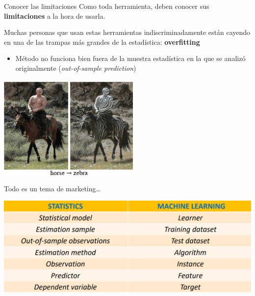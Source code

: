 \documentclass[11pt,handout,aspectratio=169]{beamer}
\begin{document}
\begin{frame}{Conocer las limitaciones}
Como toda herramienta, deben conocer sus \textbf{limitaciones} a la hora de usarla. 
\vspace{0.8cm}

Muchas personas que usan estas herramientas indiscriminadamente están cayendo en una de las trampas más grandes de la estadística: \textbf{overfitting}
\begin{itemize}
\item Método no funciona bien fuera de la muestra estadística en la que se analizó originalmente (\textit{out-of-sample prediction})
\end{itemize}

\begin{center}
\includegraphics[scale=.8]{failure_ml.png}
\end{center}

\end{frame}

\begin{frame}{Todo es un tema de marketing\dots}
\begin{center}
\includegraphics[scale=0.5]{jargon_ml.png}
\end{center}

\end{frame}
\end{document}
